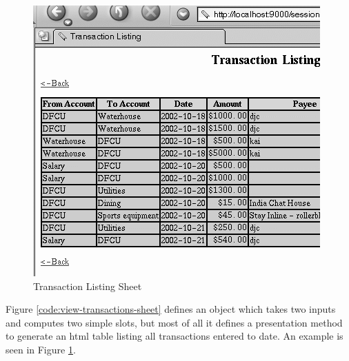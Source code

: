 \documentclass [11pt]{book}
\begin{document}
\begin{figure}
\begin{center}
\includegraphics{../images/transaction-listing.png}
\end{center}

\caption{Transaction Listing Sheet}

\label{fig:transaction-listing}

\end{figure}
Figure 
\ref{code:view-transactions-sheet} defines an object which takes two inputs and computes 
two simple slots, but most of all it defines a presentation method to 
generate an html table listing all transactions entered to date. An example 
is seen in Figure 
\ref{fig:transaction-listing}.
\end{document}
